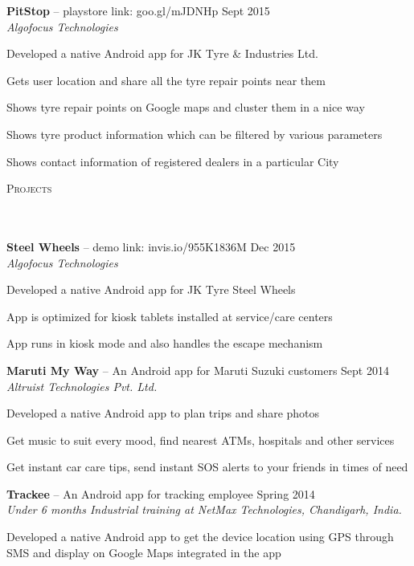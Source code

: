 \documentclass{article}
\newcommand{\header}[1]{{
\hspace*{-15pt}\vspace*{6pt} \textsc{#1}} \vspace*{-6pt} 
\lineunder
}
\newcommand{\lineunder}{
\vspace*{-8pt} \\ \hspace*{-18pt} 
\hrulefill \\
}
\newcommand{\project}[4]{{
\vspace*{2pt}%
\textbf{#1} #2 \hfill #3\\ \textit{#4} \vspace*{2pt}}
}
\renewcommand{\labelitemii}{
$\vcenter{\hbox{\tiny$\bullet$}}$\hspace*{-3pt}
}
\newenvironment{bullet-list-minor}{
\begin{list}{\labelitemii}{\setlength\leftmargin{15pt} 
\topsep 0pt \itemsep -2pt}}{\vspace*{4pt}\end{list}
}
\begin{document}
    \project{PitStop}{-- playstore link: goo.gl/mJDNHp}{Sept 2015}{Algofocus Technologies}
	\begin{bullet-list-minor}
	\item Developed a native Android app for JK Tyre \& Industries Ltd.
	\item Gets user location and share all the tyre repair points near them
	\item Shows tyre repair points on Google maps and cluster them in a nice way
	\item Shows tyre product information which can be filtered by various parameters 
	\item Shows contact information of registered dealers in a particular City 
	\end{bullet-list-minor}

\newpage
\vspace*{-20pt}
\header{Projects}
    \project{Steel Wheels}{-- demo link: invis.io/955K1836M}{Dec 2015}{Algofocus Technologies}
	\begin{bullet-list-minor}
    \item Developed a native Android app for JK Tyre Steel Wheels
 	\vspace{2pt}
    \item App is optimized for kiosk tablets installed at service/care centers
 	\vspace{2pt}
	\item App runs in kiosk mode and also handles the escape mechanism 
	\end{bullet-list-minor}
	
    \project{Maruti My Way}{-- An Android app for Maruti Suzuki customers}{Sept 2014}{Altruist Technologies Pvt. Ltd.}
	\begin{bullet-list-minor}
	\item Developed a native Android app to plan trips and share photos
	\item Get music to suit every mood, find nearest ATMs, hospitals and other services
	\item Get instant car care tips, send instant SOS alerts to your friends in times of need 
    \end{bullet-list-minor}

    \project{Trackee}{-- An Android app for tracking employee}{Spring 2014}{Under 6 months Industrial training at NetMax Technologies, Chandigarh, India.}
	\begin{bullet-list-minor}
	\item Developed a native Android app to get the device location using GPS through SMS and display on Google Maps integrated in the app
	\end{bullet-list-minor}
\end{document}
